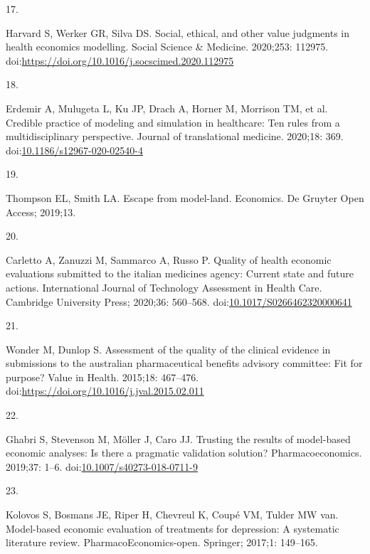 \documentclass[
]{article}
\newlength{\cslhangindent}
\newlength{\csllabelwidth}
\newlength{\cslentryspacingunit} %
\newenvironment{CSLReferences}[2] %
 {%
  \setlength{\parindent}{0pt}
  \ifodd #1
  \let\oldpar\par
  \def\par{\hangindent=\cslhangindent\oldpar}
  \fi
  \setlength{\parskip}{#2\cslentryspacingunit}
 }%
 {}
\newcommand{\CSLLeftMargin}[1]{\parbox[t]{\csllabelwidth}{#1}}
\newcommand{\CSLRightInline}[1]{\parbox[t]{\linewidth - \csllabelwidth}{#1}\break}
\begin{document}
\begin{CSLReferences}{0}{0}
\leavevmode{}%
\CSLLeftMargin{17. }%
\CSLRightInline{Harvard S, Werker GR, Silva DS. Social, ethical, and other value judgments in health economics modelling. Social Science \& Medicine. 2020;253: 112975. doi:\url{https://doi.org/10.1016/j.socscimed.2020.112975}}

\leavevmode{}%
\CSLLeftMargin{18. }%
\CSLRightInline{Erdemir A, Mulugeta L, Ku JP, Drach A, Horner M, Morrison TM, et al. Credible practice of modeling and simulation in healthcare: Ten rules from a multidisciplinary perspective. Journal of translational medicine. 2020;18: 369. doi:\href{https://doi.org/10.1186/s12967-020-02540-4}{10.1186/s12967-020-02540-4}}

\leavevmode{}%
\CSLLeftMargin{19. }%
\CSLRightInline{Thompson EL, Smith LA. Escape from model-land. Economics. De Gruyter Open Access; 2019;13. }

\leavevmode{}%
\CSLLeftMargin{20. }%
\CSLRightInline{Carletto A, Zanuzzi M, Sammarco A, Russo P. Quality of health economic evaluations submitted to the italian medicines agency: Current state and future actions. International Journal of Technology Assessment in Health Care. Cambridge University Press; 2020;36: 560--568. doi:\href{https://doi.org/10.1017/S0266462320000641}{10.1017/S0266462320000641}}

\leavevmode{}%
\CSLLeftMargin{21. }%
\CSLRightInline{Wonder M, Dunlop S. Assessment of the quality of the clinical evidence in submissions to the australian pharmaceutical benefits advisory committee: Fit for purpose? Value in Health. 2015;18: 467--476. doi:\url{https://doi.org/10.1016/j.jval.2015.02.011}}

\leavevmode{}%
\CSLLeftMargin{22. }%
\CSLRightInline{Ghabri S, Stevenson M, Möller J, Caro JJ. Trusting the results of model-based economic analyses: Is there a pragmatic validation solution? Pharmacoeconomics. 2019;37: 1--6. doi:\href{https://doi.org/10.1007/s40273-018-0711-9}{10.1007/s40273-018-0711-9}}

\leavevmode{}%
\CSLLeftMargin{23. }%
\CSLRightInline{Kolovos S, Bosmans JE, Riper H, Chevreul K, Coupé VM, Tulder MW van. Model-based economic evaluation of treatments for depression: A systematic literature review. PharmacoEconomics-open. Springer; 2017;1: 149--165. }


\end{CSLReferences}
\end{document}
